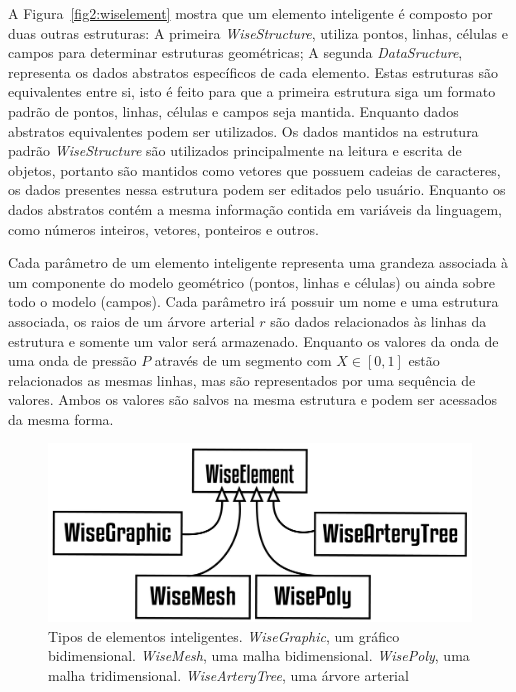 \documentclass[a4paper,12pt]{monografia}
\theoremstyle{plain}
\theoremstyle{definition}
\theoremstyle{remark}
\begin{document}
A Figura~\ref{fig2:wiselement} mostra que um elemento inteligente é composto por duas outras estruturas: A primeira \textit{WiseStructure}, utiliza pontos, linhas, células e campos para determinar estruturas geométricas; A segunda \textit{DataSructure}, representa os dados abstratos específicos de cada elemento. Estas estruturas são equivalentes entre si, isto é feito para que a primeira estrutura siga um formato padrão de pontos, linhas, células e campos seja mantida. Enquanto dados abstratos equivalentes podem ser utilizados. Os dados mantidos na estrutura padrão \textit{WiseStructure} são utilizados principalmente na leitura e escrita de objetos, portanto são mantidos como vetores que possuem cadeias de caracteres, os dados presentes nessa estrutura podem ser editados pelo usuário. Enquanto os dados abstratos contém a mesma informação contida em variáveis da linguagem, como números inteiros, vetores, ponteiros e outros.

Cada parâmetro de um elemento inteligente representa uma grandeza associada à um componente do modelo geométrico (pontos,  linhas e células) ou ainda sobre todo o modelo (campos). Cada parâmetro irá possuir um nome e uma estrutura associada, os raios de um árvore arterial $r$ são dados relacionados às linhas da estrutura e somente um valor será armazenado. Enquanto os valores da onda de uma onda de pressão $P$ através de um segmento com $X \in [0,1]$ estão relacionados as mesmas linhas, mas são representados por uma sequência de valores. Ambos os valores são salvos na mesma estrutura e podem ser acessados da mesma forma.

\begin{figure}[!htbp]
	\centering
	\includegraphics[width=\textwidth]{Figures/WiseElements@16x.png}
	\caption{Tipos de elementos inteligentes. \textit{WiseGraphic}, um gráfico bidimensional. \textit{WiseMesh}, uma malha bidimensional. \textit{WisePoly}, uma malha tridimensional. \textit{WiseArteryTree}, uma árvore arterial}
	\label{fig2:wiselements}
\end{figure}
\end{document}
